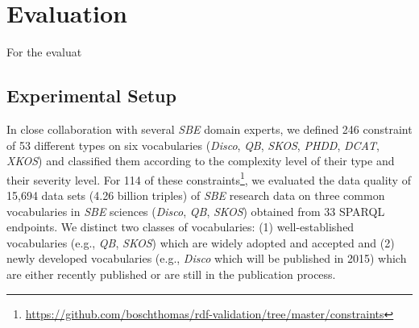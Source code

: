 \documentclass{llncs}
\newcommand{\ke}[1]{\todo[size=\small, color=red!40]{\textbf{Kai:} #1}}
\begin{document}
\section{Evaluation}
\label{evaluation}

For the evaluat

\subsection{Experimental Setup}
\label{implementation}


In close collaboration with several \emph{SBE} domain experts, we defined 246 constraint 
of 53 different types on six vocabularies (\emph{Disco}, \emph{QB}, \emph{SKOS}, \emph{PHDD}, \emph{DCAT}, \emph{XKOS}) and classified them according to the complexity level of their type and their severity level. 
For 114 of these constraints\footnote{\url{https://github.com/boschthomas/rdf-validation/tree/master/constraints}}, we evaluated the data quality of 15,694 data sets (4.26 billion triples) of \emph{SBE} research data on three common vocabularies in \emph{SBE} sciences (\emph{Disco}, \emph{QB}, \emph{SKOS}) obtained from 33 SPARQL endpoints.
We distinct two classes of vocabularies: 
(1) well-established vocabularies (e.g., \emph{QB}, \emph{SKOS}) which are widely adopted and accepted and 
(2) newly developed vocabularies (e.g., \emph{Disco} which will be published in 2015) which are either recently published or are still in the publication process.
\end{document}
